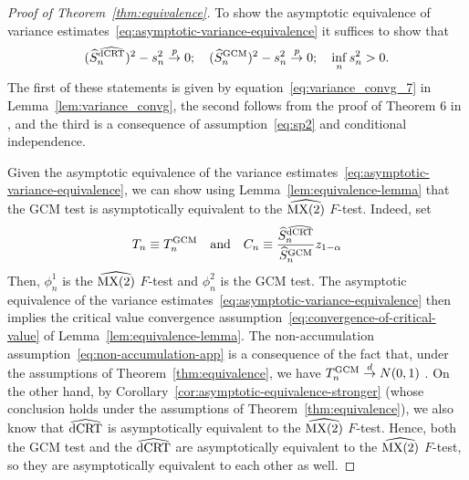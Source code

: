 \documentclass[aos]{imsart}
\theoremstyle{definition}
\theoremstyle{remark}
\newcommand{\convp}{\overset p \rightarrow}             %
\newcommand{\convd}{\overset d \rightarrow}             %
\newcommand{\GCM}{\textnormal{GCM}}						%
\newcommand{\dCRThat}{\widehat{\textnormal{dCRT}}}		%
\newcommand{\MXtwohat}{\widehat{\textnormal{MX(2)}}}	%
\begin{document}
\begin{proof}[Proof of Theorem~\ref{thm:equivalence}]

To show the asymptotic equivalence of variance estimates~\eqref{eq:asymptotic-variance-equivalence} it suffices to show that
\begin{equation}
(\widehat S_n^{\dCRThat})^2 - s^2_n \convp 0; \quad (\widehat S_n^{\GCM})^2 - s^2_n \convp 0; \quad \inf_{n} s^2_n > 0.
\end{equation}
The first of these statements is given by equation~\eqref{eq:variance_convg_7} in Lemma~\ref{lem:variance_convg}, the second follows from the proof of Theorem 6 in \citet{Shah2018}, and the third is a consequence of assumption~\eqref{eq:sp2} and conditional independence.
  
Given the asymptotic equivalence of the variance estimates~\eqref{eq:asymptotic-variance-equivalence}, we can show using Lemma~\ref{lem:equivalence-lemma} that the GCM test is asymptotically equivalent to the $\MXtwohat$ $F$-test. Indeed, set
\begin{equation}
	T_n \equiv T_n^\GCM \quad \text{and} \quad C_n \equiv \frac{\widehat S_n^{\dCRThat}}{\widehat S_{n}^{\GCM}}z_{1-\alpha}
\end{equation}
Then, $\phi_n^1$ is the $\MXtwohat$ $F$-test and $\phi_n^2$ is the GCM test. The asymptotic equivalence of the variance estimates~\eqref{eq:asymptotic-variance-equivalence} then implies the critical value convergence assumption~\eqref{eq:convergence-of-critical-value} of Lemma~\ref{lem:equivalence-lemma}. The non-accumulation assumption~\eqref{eq:non-accumulation-app} is a consequence of the fact that, under the assumptions of Theorem~\ref{thm:equivalence}, we have $T^{\text{\GCM}}_n \convd N(0,1)$ \citep{Shah2018}. On the other hand, by Corollary~\ref{cor:asymptotic-equivalence-stronger} (whose conclusion holds under the assumptions of Theorem~\ref{thm:equivalence}), we also know that $\dCRThat$ is asymptotically equivalent to the $\MXtwohat$ $F$-test. Hence, both the GCM test and the $\dCRThat$ are asymptotically equivalent to the $\MXtwohat$ $F$-test, so they are asymptotically equivalent to each other as well.
\end{proof}
\end{document}
